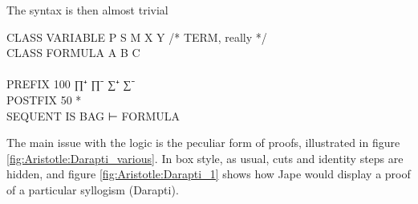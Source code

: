 The syntax is then almost trivial
\begin{japeish}
CLASS VARIABLE P S M X Y               /* TERM, really */\\
CLASS FORMULA A B C\\
\\
PREFIX 100 ∏⁺ ∏⁻ ∑⁺ ∑⁻\\
POSTFIX 50 *\\

SEQUENT IS BAG ⊢ FORMULA
\end{japeish}
%
%
%
%
The main issue with the logic is the peculiar form of proofs, illustrated in figure \ref{fig:Aristotle:Darapti_various}. In box style, as usual, cuts and identity steps are hidden, and figure \ref{fig:Aristotle:Darapti_1} shows how Jape would display a proof of a particular syllogism (Darapti). 
